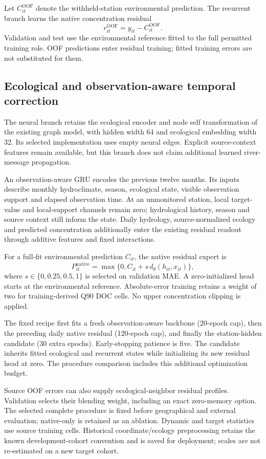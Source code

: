 \documentclass[11pt]{article}
\begin{document}
Let $C^{\mathrm{OOF}}_{it}$ denote the withheld-station environmental prediction. The recurrent branch learns the native concentration residual
\[
 r^{\mathrm{OOF}}_{it}=y_{it}-C^{\mathrm{OOF}}_{it}.
\]
Validation and test use the environmental reference fitted to the full permitted training role. OOF predictions enter residual training; fitted training errors are not substituted for them.

\subsection{Ecological and observation-aware temporal correction}
The neural branch retains the ecological encoder and node self transformation of the existing graph model, with hidden width 64 and ecological embedding width 32. Its selected implementation uses empty neural edges. Explicit source-context features remain available, but this branch does not claim additional learned river-message propagation.

An observation-aware GRU encodes the previous twelve months. Its inputs describe monthly hydroclimate, season, ecological state, visible observation support and elapsed observation time. At an unmonitored station, local target-value and local-support channels remain zero; hydrological history, season and source context still inform the state. Daily hydrology, source-normalized ecology and predicted concentration additionally enter the existing residual readout through additive features and fixed interactions.

For a full-fit environmental prediction $C_{it}$, the native residual expert is
\[
 P^{\mathrm{native}}_{it}=\max\{0,C_{it}+s\,d_\theta(h_{it},x_{it})\},
\]
where $s\in\{0,0.25,0.5,1\}$ is selected on validation MAE. A zero-initialized head starts at the environmental reference. Absolute-error training retains a weight of two for training-derived Q90 DOC cells. No upper concentration clipping is applied.

The fixed recipe first fits a fresh observation-aware backbone (20-epoch cap), then the preceding daily native residual (120-epoch cap), and finally the station-hidden candidate (30 extra epochs). Early-stopping patience is five. The candidate inherits fitted ecological and recurrent states while initializing its new residual head at zero. The procedure comparison includes this additional optimization budget.

Source OOF errors can also supply ecological-neighbor residual profiles. Validation selects their blending weight, including an exact zero-memory option. The selected complete procedure is fixed before geographical and external evaluation; native-only is retained as an ablation. Dynamic and target statistics use source training cells. Historical coordinate/ecology preprocessing retains the known development-cohort convention and is saved for deployment; scales are not re-estimated on a new target cohort.
\end{document}
